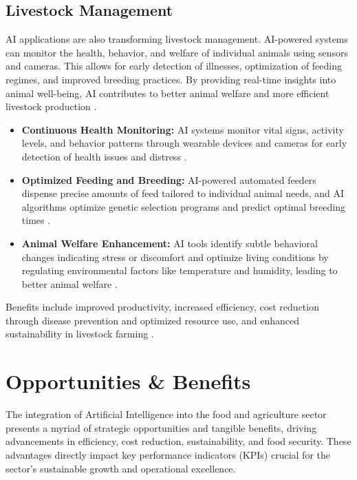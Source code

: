 \subsection{Livestock Management}
AI applications are also transforming livestock management. AI-powered systems can monitor the health, behavior, and welfare of individual animals using sensors and cameras. This allows for early detection of illnesses, optimization of feeding regimes, and improved breeding practices. By providing real-time insights into animal well-being, AI contributes to better animal welfare and more efficient livestock production \cite{kumar2025reviewai}.
\begin{itemize}
    \item \textbf{Continuous Health Monitoring:} AI systems monitor vital signs, activity levels, and behavior patterns through wearable devices and cameras for early detection of health issues and distress \cite{Ambiq_Livestock, Medium_Livestock}.
    \item \textbf{Optimized Feeding and Breeding:} AI-powered automated feeders dispense precise amounts of feed tailored to individual animal needs, and AI algorithms optimize genetic selection programs and predict optimal breeding times \cite{Picsellia_Livestock, Wikifarmer_Livestock}.
    \item \textbf{Animal Welfare Enhancement:} AI tools identify subtle behavioral changes indicating stress or discomfort and optimize living conditions by regulating environmental factors like temperature and humidity, leading to better animal welfare \cite{FeedAndAdditive_Livestock, Technolynx_Livestock}.
\end{itemize}
Benefits include improved productivity, increased efficiency, cost reduction through disease prevention and optimized resource use, and enhanced sustainability in livestock farming \cite{Meegle_Livestock, NIH_Livestock}.

\section{Opportunities \& Benefits}

The integration of Artificial Intelligence into the food and agriculture sector presents a myriad of strategic opportunities and tangible benefits, driving advancements in efficiency, cost reduction, sustainability, and food security. These advantages directly impact key performance indicators (KPIs) crucial for the sector's sustainable growth and operational excellence.

